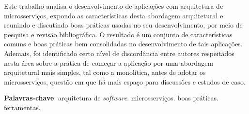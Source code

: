 \setlength{\absparsep}{18pt} %
\begin{resumo}

Este trabalho analisa o desenvolvimento de aplicações com arquitetura de microsserviços, expondo as características desta abordagem arquitetural e reunindo e discutindo boas práticas usadas no seu desenvolvimento, por meio de pesquisa e revisão bibliográfica. O resultado é um conjunto de características comuns e boas práticas bem consolidadas no desenvolvimento de tais aplicações. Ademais, foi identificado certo nível de discordância entre autores respeitados nesta área sobre a prática de começar a aplicação por uma abordagem arquitetural mais simples, tal como a monolítica, antes de adotar os microsserviços, questão em que há mais espaço para discussões e estudos de caso. 


 \textbf{Palavras-chave}: arquitetura de \emph{software}. microsserviços. boas práticas. ferramentas.
\end{resumo}
